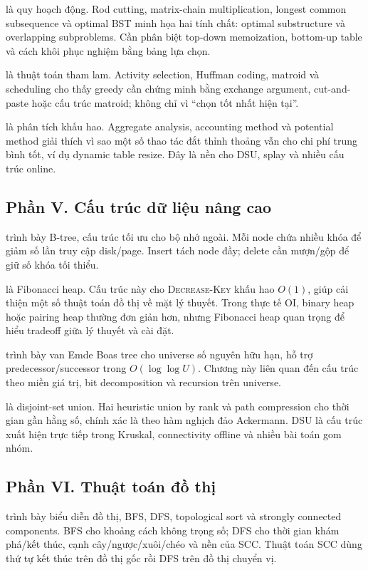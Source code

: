 \documentclass[11pt]{article}
\begin{document}
 là quy hoạch động. Rod cutting, matrix-chain multiplication,
longest common subsequence và optimal BST minh họa hai tính chất: optimal
substructure và overlapping subproblems. Cần phân biệt top-down memoization,
bottom-up table và cách khôi phục nghiệm bằng bảng lựa chọn.

 là thuật toán tham lam. Activity selection, Huffman coding,
matroid và scheduling cho thấy greedy cần chứng minh bằng exchange argument,
cut-and-paste hoặc cấu trúc matroid; không chỉ vì ``chọn tốt nhất hiện tại''.

 là phân tích khấu hao. Aggregate analysis, accounting method
và potential method giải thích vì sao một số thao tác đắt thỉnh thoảng vẫn cho
chi phí trung bình tốt, ví dụ dynamic table resize. Đây là nền cho DSU, splay và
nhiều cấu trúc online.

\subsection*{Phần V. Cấu trúc dữ liệu nâng cao}

 trình bày B-tree, cấu trúc tối ưu cho bộ nhớ ngoài. Mỗi node
chứa nhiều khóa để giảm số lần truy cập disk/page. Insert tách node đầy; delete
cần mượn/gộp để giữ số khóa tối thiểu.

 là Fibonacci heap. Cấu trúc này cho \textsc{Decrease-Key} khấu
hao \(O(1)\), giúp cải thiện một số thuật toán đồ thị về mặt lý thuyết. Trong
thực tế OI, binary heap hoặc pairing heap thường đơn giản hơn, nhưng Fibonacci
heap quan trọng để hiểu tradeoff giữa lý thuyết và cài đặt.

 trình bày van Emde Boas tree cho universe số nguyên hữu hạn,
hỗ trợ predecessor/successor trong \(O(\log\log U)\). Chương này liên quan đến
cấu trúc theo miền giá trị, bit decomposition và recursion trên universe.

 là disjoint-set union. Hai heuristic union by rank và path
compression cho thời gian gần hằng số, chính xác là theo hàm nghịch đảo
Ackermann. DSU là cấu trúc xuất hiện trực tiếp trong Kruskal, connectivity
offline và nhiều bài toán gom nhóm.

\subsection*{Phần VI. Thuật toán đồ thị}

 trình bày biểu diễn đồ thị, BFS, DFS, topological sort và strongly
connected components. BFS cho khoảng cách không trọng số; DFS cho thời gian
khám phá/kết thúc, cạnh cây/ngược/xuôi/chéo và nền của SCC. Thuật toán SCC
dùng thứ tự kết thúc trên đồ thị gốc rồi DFS trên đồ thị chuyển vị.
\end{document}
